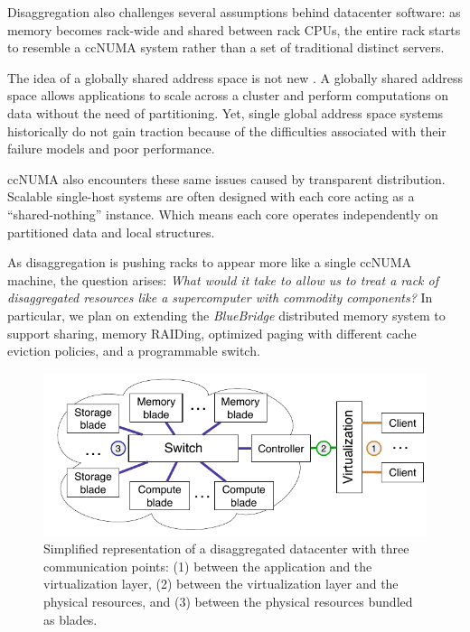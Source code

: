 Disaggregation also challenges several assumptions behind datacenter software:
as memory becomes rack-wide and shared between rack CPUs, the entire rack starts
to resemble a ccNUMA system rather than a set of traditional distinct servers.

The idea of a globally shared address space is not new . A
globally shared address space allows applications to scale across a cluster and
perform computations on data without the need of partitioning. Yet, single
global address space systems historically do not gain traction because of the
difficulties associated with their failure models and poor performance.

ccNUMA also encounters these same issues caused by transparent distribution.
Scalable single-host systems are often designed with each core acting as a
``shared-nothing'' instance. Which means each core operates independently on
partitioned data and local structures. 

As disaggregation is pushing racks to appear more like a single ccNUMA machine,
the question arises: \emph{What would it take to allow us to treat a rack of
disaggregated resources like a supercomputer with commodity components?} In
particular, we plan on extending the \emph{BlueBridge} distributed memory
system to support sharing, memory RAIDing, optimized paging with different cache
eviction policies, and a programmable switch. 


\begin{figure}
    \centering
    \includegraphics[width=\columnwidth]{fig/ddc-overview}
    \caption{Simplified representation of a disaggregated datacenter with
    three communication points: (1) between the application and the
    virtualization layer,
    (2) between the virtualization layer and the physical resources, and (3)
    between the physical resources bundled as blades.}
    \label{fig:DDC}
\end{figure}

